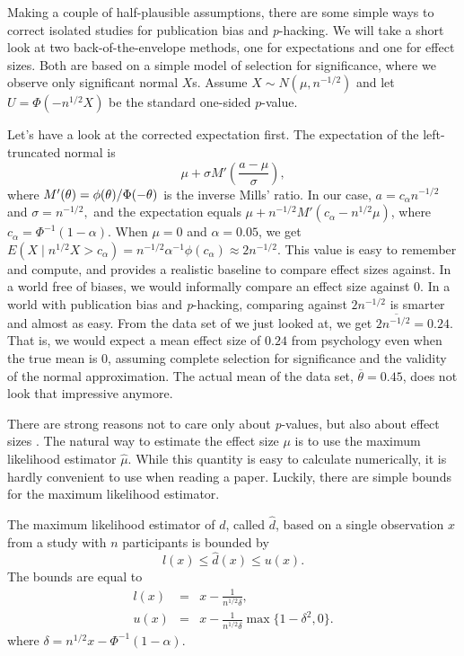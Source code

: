 Making a couple of half-plausible assumptions, there are some simple ways to correct isolated studies for publication bias and \emph{p}-hacking. We will take a short look at two back-of-the-envelope methods, one for expectations and one for effect sizes. Both are based on a simple model of selection for significance, where we observe only significant normal $X$s. Assume $X\sim N(\mu,n^{-1/2})$ and let $U=\Phi(-n^{1/2}X)$ be the standard one-sided $p$-value. 

Let's have a look at the corrected expectation first. The expectation of the left-truncated normal is \parencite[Section 10.1]{Johnson1994-ag}
\begin{equation}
\mu+\sigma M'\left(\frac{a-\mu}{\sigma}\right),\label{eq:mean of truncated normal}
\end{equation}
where
$M'(\text{\ensuremath{\theta}})=\phi(\text{\ensuremath{\theta}})/\Phi(-\text{\ensuremath{\theta}})$
is the inverse Mills' ratio. 
In our case, $a=c_{\alpha}n^{-1/2}$ and $\sigma=n^{-1/2},$ and the expectation equals $\mu+n^{-1/2}M'(c_{\alpha}-n^{1/2}\mu)$, where $c_\alpha = \Phi^{-1}(1-\alpha)$. When
$\mu=0$ and $\alpha=0.05$, we get $E(X\mid n^{1/2}X>c_{\alpha})=n^{-1/2}\alpha^{-1}\phi(c_{\alpha})\approx2n^{-1/2}.$
This value is easy to remember and compute, and provides a realistic baseline to compare effect sizes against. In a world free of biases, we would informally compare an effect size against $0$. In a world with publication bias and \emph{p}-hacking, comparing against $2n^{-1/2}$ is smarter and almost as easy. From the data set of \textcite{Motyl2017-dx} we just looked at, we get $2\overline{n^{-1/2}}=0.24$. That is, we would expect a mean effect size of $0.24$ from psychology even when the true mean is $0$, assuming complete selection for significance and the validity of the normal approximation. The actual mean of the data set, $\overline{\theta}=0.45$, does not look that impressive anymore.

There are strong reasons not to care only about \emph{p}-values, but also about effect sizes \parencite{Funder2019-tg}. The natural way to
estimate the effect size $\mu$ is to use the maximum likelihood estimator $\hat{\mu}$. While this quantity is easy to calculate numerically, it is hardly convenient to use when reading a paper. Luckily, there are simple bounds for the maximum likelihood estimator.
\begin{proposition}
\label{prop:maximum likelihood bounds}The maximum likelihood estimator of $d$, called $\hat{d}$, based on a single observation $x$ from a study with $n$ participants is bounded by 
\[
l(x)\leq\hat{d}(x)\leq u(x).
\]
The bounds are equal to
\begin{eqnarray}
l(x) & = & x-\frac{1}{n^{1/2}\delta},\label{eq:lower bound}\\
u(x) & = & x-\frac{1}{n^{1/2}\delta}\max\{1-\delta^{2},0\}.\label{eq:upper bound}
\end{eqnarray}
where $\delta=n^{1/2}x-\Phi^{-1}(1-\alpha)$.
\end{proposition}

